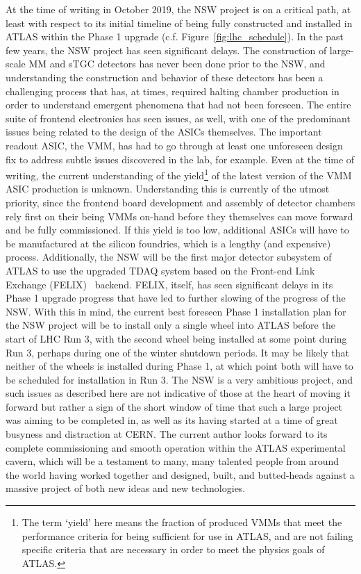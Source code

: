 At the time of writing in October 2019, the NSW project is on a critical path, at least with respect to its initial timeline of
being fully constructed and installed in ATLAS within the Phase 1 upgrade (c.f. Figure~\ref{fig:lhc_schedule}).
In the past few years, the NSW project has seen significant delays.
The construction of large-scale MM and sTGC detectors has never been done prior to the NSW, and
understanding the construction and behavior of these detectors has been a challenging process
that has, at times, required halting chamber production in order to understand emergent phenomena
that had not been foreseen.
The entire suite of frontend electronics has seen issues, as well, with one of the predominant issues being related to the
design of the ASICs themselves.
The important readout ASIC, the VMM, has had to go through at least one unforeseen design fix to address subtle
issues discovered in the lab, for example.
Even at the time of writing, the current understanding of the yield\footnote{The term `yield' here means
the fraction of produced VMMs that meet the performance criteria for being sufficient for use in ATLAS, and are not
failing specific criteria that are necessary in order to meet the physics goals of ATLAS.}
of the latest version of the VMM ASIC production is unknown.
Understanding this is currently of the utmost priority, since the frontend board development and assembly of
detector chambers rely first on their being VMMs on-hand before they themselves can move forward and be fully commissioned.
If this yield is too low, additional ASICs will have to be manufactured at the silicon foundries, which is a lengthy (and expensive) process.
Additionally, the NSW will be the first major detector subsystem of ATLAS to use the upgraded TDAQ system based
on the Front-end Link Exchange (FELIX)~\cite{FELIX} backend.
FELIX, itself, has seen significant delays in its Phase 1 upgrade progress that have led to 
further slowing of the progress of the NSW.
With this in mind, the current best foreseen Phase 1 installation plan for the NSW project will be to install only a single wheel
into ATLAS before the start of LHC Run 3, with the second wheel being installed at some point
during Run 3, perhaps during one of the winter shutdown periods.
It may be likely that neither of the wheels is installed during Phase 1, at which point both will have to be scheduled
for installation in Run 3.
The NSW is a very ambitious project, and such issues as described here are not indicative of those
at the heart of moving it forward but rather a sign of the short window of time that such a large project
was aiming to be completed in, as well as its having started at a time of great busyness and distraction
at CERN.
The current author looks forward to its complete commissioning and smooth operation within the ATLAS experimental cavern,
which will be a testament to many, many talented people from around the world having worked together
and designed, built, and butted-heads against a massive project of both new ideas and new technologies.


